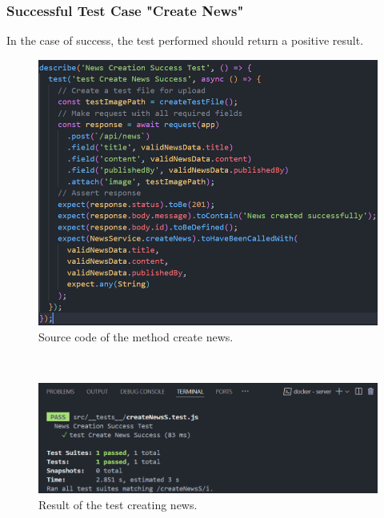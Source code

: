 \subsubsection{Successful Test Case "Create News"} 
In the case of success, the test performed should return a positive result.
\begin{figure}[h!]
    \centering
    \includegraphics[width=1\textwidth]{figures/create newsS code.png} 
    \caption{Source code of the method create news.}
\end{figure} \
\begin{figure}[h!]
    \centering
    \includegraphics[width=1\textwidth]{figures/result create newsS.png}  
    \caption{Result of the test creating news.}
\end{figure} \
\clearpage
